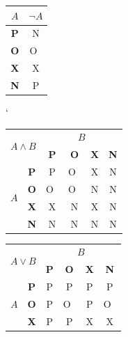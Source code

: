 \documentclass[a4paper, 11pt]{article}
\begin{document}
\begin{table}[h]
	\centering
	\begin{tabular}{|c|c|}  \hline
		$A$        & $\neg A$ \\  \hline
		\textbf{P} & N        \\  \hline
		\textbf{O} & O~       \\  \hline
		\textbf{X} & X        \\  \hline
		\textbf{N} & P        \\  \hline
	\end{tabular}
	\catcode`
	\begin{tabular}{|c|c|c|c|c|c|}  \hline
		\multicolumn{2}{|l|}{\multirow{2}{*}{$A \wedge B$}} & \multicolumn{4}{c|}{$B$}                                            \\ \cline{3-6}
		\multicolumn{2}{|l|}{}                              & \textbf{P}               & \textbf{O} & \textbf{X} & \textbf{N}     \\  \hline
		\multirow{4}{*}{$A$}                                & \textbf{P}               & P          & O~         & X          & N \\  \cline{2-6}
		                                                    & \textbf{O}               & O~         & O~         & N          & N \\  \cline{2-6}
		                                                    & \textbf{X}               & X          & N          & X          & N \\  \cline{2-6}
		                                                    & \textbf{N}               & N          & N          & N          & N \\   \hline
	\end{tabular}
	\begin{tabular}{|c|c|c|c|c|c|}  \hline
		\multicolumn{2}{|l|}{\multirow{2}{*}{$A\vee B$}} & \multicolumn{4}{c|}{$B$}                                             \\ \cline{3-6}
		\multicolumn{2}{|l|}{}                           & \textbf{P}               & \textbf{O} & \textbf{X} & \textbf{N}      \\  \hline
		\multirow{4}{*}{$A$}                             & \textbf{P}               & P          & P          & P          & P  \\  \cline{2-6}
		                                                 & \textbf{O}               & P          & O~         & P          & O~ \\  \cline{2-6}
		                                                 & \textbf{X}               & P          & P          & X          & X  \\  \cline{2-6}

\end{tabular}
\end{table}
\end{document}
